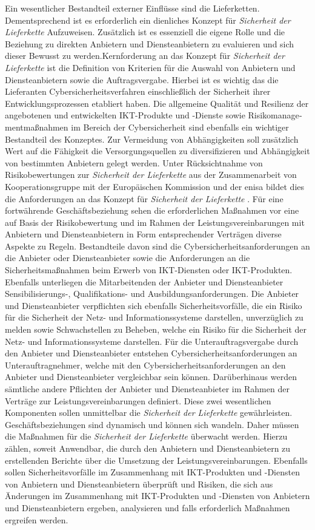 \documentclass[11pt,a4paper,hidelinks]{article}   %
\begin{document}
            Ein wesentlicher Bestandteil externer Einflüsse sind die Lieferketten. Dementsprechend ist es erforderlich ein dienliches Konzept für \emph{Sicherheit der Lieferkette} Aufzuweisen. Zusätzlich ist es essenziell die eigene Rolle und die Beziehung zu direkten Anbietern und Diensteanbietern zu evaluieren und sich dieser Bewusst zu werden.Kernforderung an das Konzept für \emph{Sicherheit der Lieferkette}  ist die Definition von Kriterien für die Auswahl von Anbietern und Diensteanbietern sowie die Auftragsvergabe. Hierbei ist es wichtig das die Lieferanten Cybersicherheitsverfahren einschließlich der Sicherheit ihrer Entwicklungsprozessen etabliert haben. Die allgemeine Qualität und Resilienz der angebotenen und entwickelten IKT-Produkte und -Dienste sowie Risikomanage­mentmaßnahmen im Bereich der Cybersicherheit sind ebenfalls ein wichtiger Bestandteil des Konzeptes. Zur Vermeidung von Abhängigkeiten soll zusätzlich Wert auf die Fähigkeit die Versorgungsquellen zu diversifizieren und Abhängigkeit von bestimmten Anbietern gelegt werden. Unter Rücksichtnahme von Risikobewertungen zur \emph{Sicherheit der Lieferkette}  aus der Zusammenarbeit von Kooperationsgruppe mit der Europäischen Kommission und der \gls{enisa} bildet dies die Anforderungen an das Konzept für \emph{Sicherheit der Lieferkette} . Für eine fortwährende Geschäftsbeziehung sehen die erforderlichen Maßnahmen vor eine auf Basis der Risikobewertung und im Rahmen der Leistungsverein­barungen mit Anbietern und Diensteanbietern in Form entsprechender Verträgen diverse Aspekte zu Regeln. Bestandteile davon sind die Cybersicherheitsanforderungen an die Anbieter oder Diensteanbieter sowie die Anforderungen an die Sicherheitsmaßnahmen beim Erwerb von IKT-Diensten oder IKT-Produkten. Ebenfalls unterliegen die Mitarbeitenden der Anbieter und Diensteanbieter Sensibilisierungs-, Qualifikations- und Ausbildungsanforderungen. Die Anbieter und Diensteanbieter verpflichten sich ebenfalls Sicherheitsvorfälle, die ein Risiko für die Sicherheit der Netz- und Informationssysteme darstellen, unverzüglich zu melden sowie Schwachstellen zu Beheben, welche ein Risiko für die Sicherheit der Netz- und Informationssysteme darstellen. Für die Unterauftragsvergabe durch den Anbieter und Diensteanbieter entstehen Cybersicherheitsanforderungen an Unterauftragnehmer, welche mit den Cybersicherheitsanforderungen an den Anbieter und Diensteanbieter vergleichbar sein können. Darüberhinaus werden sämtliche andere Pflichten der Anbieter und Diensteanbieter im Rahmen der Verträge zur Leistungsverein­barungen definiert. Diese zwei wesentlichen Komponenten sollen unmittelbar die \emph{Sicherheit der Lieferkette} gewährleisten. Geschäftsbeziehungen sind dynamisch und können sich wandeln. Daher müssen die Maßnahmen für die \emph{Sicherheit der Lieferkette} überwacht werden. Hierzu zählen, soweit Anwendbar, die durch den Anbietern und Diensteanbietern zu erstellenden Berichte über die Umsetzung der Leistungsvereinbarungen. Ebenfalls sollen Sicherheitsvorfälle im Zusammenhang mit IKT-Produkten und -Diensten von Anbietern und Diensteanbietern überprüft und Risiken, die sich aus Änderungen im Zusammenhang mit IKT-Produkten und -Diensten von Anbietern und Diensteanbietern ergeben, analysieren und falls erforderlich Maßnahmen ergreifen werden. 
\end{document}
